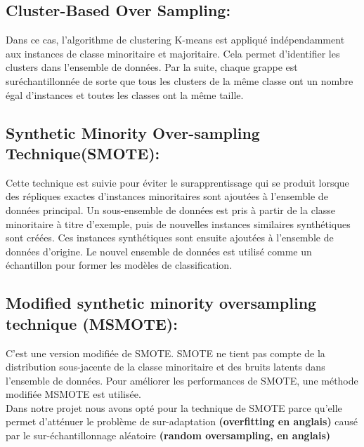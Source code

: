 \documentclass[12pt, french]{report}
\begin{document}
\subsection{Cluster-Based Over Sampling:}
Dans ce cas, l'algorithme de clustering K-means est appliqué indépendamment aux instances de classe minoritaire et majoritaire. Cela permet d'identifier les clusters dans l'ensemble de données. Par la suite, chaque grappe est suréchantillonnée de sorte que tous les clusters de la même classe ont un nombre égal d'instances et toutes les classes ont la même taille.
\subsection{Synthetic Minority Over-sampling Technique(SMOTE):}
Cette technique est suivie pour éviter le surapprentissage qui se produit lorsque des répliques exactes d'instances minoritaires sont ajoutées à l'ensemble de données principal. Un sous-ensemble de données est pris à partir de la classe minoritaire à titre d'exemple, puis de nouvelles instances similaires synthétiques sont créées. Ces instances synthétiques sont ensuite ajoutées à l'ensemble de données d'origine. Le nouvel ensemble de données est utilisé comme un échantillon pour former les modèles de classification.
\subsection{Modified synthetic minority oversampling technique (MSMOTE):}
C'est une version modifiée de SMOTE. SMOTE ne tient pas compte de la distribution sous-jacente de la classe minoritaire et des bruits latents dans l'ensemble de données. Pour améliorer les performances de SMOTE, une méthode modifiée MSMOTE est utilisée.\\

Dans notre projet nous avons opté pour la technique de SMOTE parce qu'elle permet d'atténuer le problème de sur-adaptation \textbf{(overfitting en anglais)} causé par le sur-échantillonnage aléatoire \textbf{(random oversampling, en anglais)} \\
\end{document}

